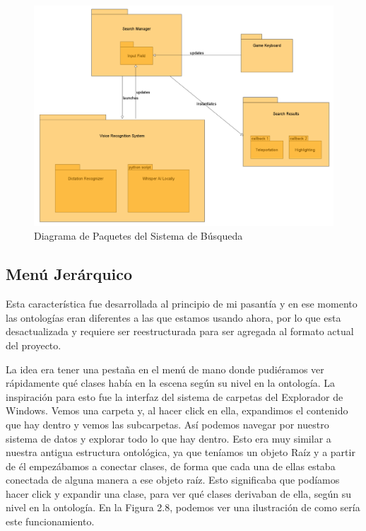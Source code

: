\begin{figure}[ht]
   \begin{center}
      \includegraphics[width=1\linewidth]{chapter2/figures/searchsystem.png}
   \end{center}
   \caption[Diagrama de Paquetes del Sistema de Búsqueda]
   {\footnotesize Diagrama de Paquetes del Sistema de Búsqueda}
\end{figure}

\subsection{Menú Jerárquico}

Esta característica fue desarrollada al principio de mi pasantía y en ese momento las ontologías eran diferentes a las que estamos usando ahora, por lo que esta desactualizada y requiere ser reestructurada para ser agregada al formato actual del proyecto.

La idea era tener una pestaña en el menú de mano donde pudiéramos ver rápidamente qué clases había en la escena según su nivel en la ontología. La inspiración para esto fue la interfaz del sistema de carpetas del Explorador de Windows. Vemos una carpeta y, al hacer click en ella, expandimos el contenido que hay dentro y vemos las subcarpetas.
Así podemos navegar por nuestro sistema de datos y explorar todo lo que hay dentro. Esto era muy similar a nuestra antigua estructura ontológica, ya que teníamos un objeto Raíz y a partir de él empezábamos a conectar clases, de forma que cada una de ellas estaba conectada de alguna manera a ese objeto raíz.
Esto significaba que podíamos hacer click y expandir una clase, para ver qué clases derivaban de ella, según su nivel en la ontología. En la Figura 2.8, podemos ver una ilustración de como sería este funcionamiento.

